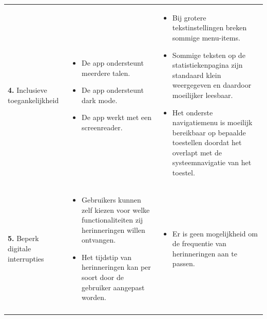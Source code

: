 {\begin{longtable}{
            >{\raggedright\arraybackslash}p{5.23cm}
            >{\raggedright\arraybackslash}p{4.93cm}
            >{\raggedright\arraybackslash}p{4.93cm}
        }
        \textbf{4.} Inclusieve toegankelijkheid
        & 
        \begin{itemize}[nosep,leftmargin=*,itemsep=10pt]
            \renewcommand{\labelitemi}{+}
            \item De app ondersteunt meerdere talen.
            \item De app ondersteunt dark mode.
            \item De app werkt met een screenreader.
        \end{itemize}
        & 
        \begin{itemize}[nosep,leftmargin=*,itemsep=10pt]
            \renewcommand{\labelitemi}{-}
            \item Bij grotere tekstinstellingen breken sommige menu-items.
            \item Sommige teksten op de statistiekenpagina zijn standaard klein weergegeven en daardoor moeilijker leesbaar.
            \item Het onderste navigatiemenu is moeilijk bereikbaar op bepaalde toestellen doordat het overlapt met de systeemnavigatie van het toestel.
        \end{itemize}
        \\
        
        \addlinespace[5pt]
        
        \textbf{5.} Beperk digitale interrupties
        & 
        \begin{itemize}[nosep,leftmargin=*,itemsep=10pt]
            \renewcommand{\labelitemi}{+}
            \item Gebruikers kunnen zelf kiezen voor welke functionaliteiten zij herinneringen willen ontvangen.
            \item Het tijdstip van herinneringen kan per soort door de gebruiker aangepast worden.
        \end{itemize}
        & 
        \begin{itemize}[nosep,leftmargin=*,itemsep=10pt]
            \renewcommand{\labelitemi}{-}
            \item Er is geen mogelijkheid om de frequentie van herinneringen aan te passen.
        \end{itemize}
        \\
        
        \addlinespace[5pt]
        

\end{longtable}}
